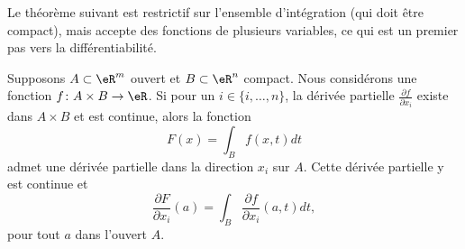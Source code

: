 Le théorème suivant est restrictif sur l'ensemble d'intégration (qui doit être compact), mais accepte des fonctions de plusieurs variables, ce qui est un premier pas vers la différentiabilité.
\begin{proposition}        \label{PropDerrSSIntegraleDSD}
	Supposons \( A\subset\eR^m\) ouvert et \( B\subset\eR^n\) compact. Nous considérons une fonction \( f\colon A\times B\to \eR\). Si pour un \( i\in\{ i,\ldots,n \}\), la dérivée partielle \( \frac{ \partial f }{ \partial x_i }\) existe dans \( A\times B\) et est continue, alors la fonction
	\begin{equation}
		F(x)=\int_Bf(x,t)dt
	\end{equation}
	admet une dérivée partielle dans la direction \( x_i\) sur \( A\). Cette dérivée partielle y est continue et
	\begin{equation}
		\frac{ \partial F }{ \partial x_i }(a)=\int_B\frac{ \partial f }{ \partial x_i }(a,t)dt,
	\end{equation}
	pour tout \( a\) dans l'ouvert \( A\).
\end{proposition}

